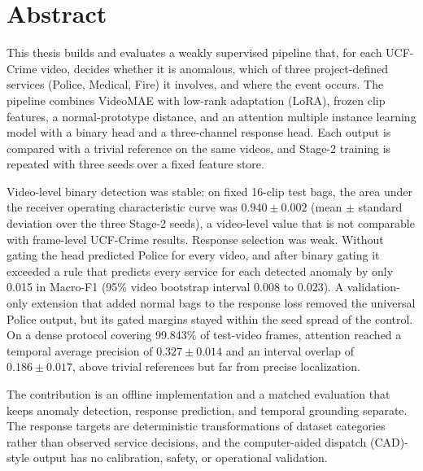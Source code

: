 \chapter*{Abstract}

This thesis builds and evaluates a weakly supervised pipeline that, for each
UCF-Crime video, decides whether it is anomalous, which of three
project-defined services (Police, Medical, Fire) it involves, and where the
event occurs. The pipeline combines VideoMAE with low-rank adaptation (LoRA),
frozen clip features, a normal-prototype distance, and an attention multiple
instance learning model with a binary head and a three-channel response head.
Each output is compared with a trivial reference on the same videos, and
Stage-2 training is repeated with three seeds over a fixed feature store.

Video-level binary detection was stable: on fixed 16-clip test bags, the area
under the receiver operating characteristic curve was $0.940\pm0.002$ (mean
$\pm$ standard deviation over the three Stage-2 seeds), a video-level value
that is not comparable with frame-level UCF-Crime results. Response selection
was weak. Without gating the head predicted Police for every video, and after
binary gating it exceeded a rule that predicts every service for each detected
anomaly by only 0.015 in Macro-F1 (95\% video bootstrap interval 0.008 to
0.023). A validation-only extension that added normal bags to the response loss
removed the universal Police output, but its gated margins stayed within the
seed spread of the control. On a dense protocol covering 99.843\% of test-video
frames, attention reached a temporal average precision of $0.327\pm0.014$ and
an interval overlap of $0.186\pm0.017$, above trivial references but far from
precise localization.

The contribution is an offline implementation and a matched evaluation that
keeps anomaly detection, response prediction, and temporal grounding separate.
The response targets are deterministic transformations of dataset categories
rather than observed service decisions, and the computer-aided dispatch
(CAD)-style output has no calibration, safety, or operational validation.
